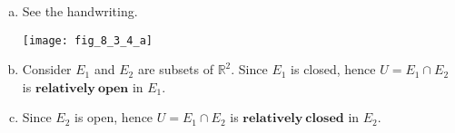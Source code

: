 \begin{Exercise}
\begin{enumerate}[a)]
\item
\begin{sketch}
See the handwriting.

\texttt{[image: fig\_8\_3\_4\_a]}

\end{sketch}

\item
\begin{solution}
Consider $E_1$ and $E_2$ are subsets of $\mathbb{R}^2$. Since $E_1$ is closed, hence $U=E_1\cap E_2$ is $\mathbf{relatively\ open}$ in $E_1$.
\end{solution}

\item
\begin{solution}
Since $E_2$ is open, hence $U=E_1\cap E_2$ is $\mathbf{relatively\ closed}$ in $E_2$.
\end{solution}
\end{enumerate}
\end{Exercise}